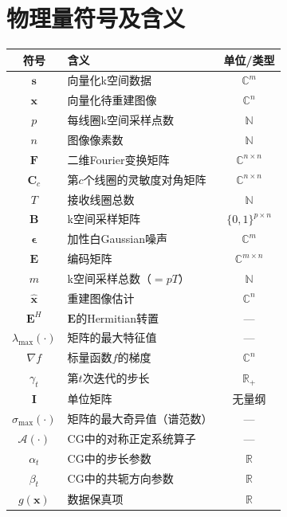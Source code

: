 \documentclass[12pt]{article}
\begin{document}
\section{物理量符号及含义}
\begin{table}[ht]
    \small
    \centering
    \begin{tabularx}{\textwidth}{c X c}
        \toprule
        \textbf{符号} & \textbf{含义} & \textbf{单位/类型} \\
        \midrule
        $\bm{s}$ & 向量化k空间数据 & $\mathbb{C}^m$ \\
        $\bm{x}$ & 向量化待重建图像 & $\mathbb{C}^n$ \\
        $p$ & 每线圈k空间采样点数 & $\mathbb{N}$ \\
        $n$ & 图像像素数 & $\mathbb{N}$ \\
        $\mathbf{F}$ & 二维Fourier变换矩阵 & $\mathbb{C}^{n\times n}$ \\
        $\mathbf{C}_c$ & 第$c$个线圈的灵敏度对角矩阵 & $\mathbb{C}^{n\times n}$ \\
        $T$ & 接收线圈总数 & $\mathbb{N}$ \\
        $\mathbf{B}$ & k空间采样矩阵 & $\{0,1\}^{p\times n}$ \\
        $\bm{\epsilon}$ & 加性白Gaussian噪声 & $\mathbb{C}^m$ \\
        $\mathbf{E}$ & 编码矩阵 & $\mathbb{C}^{m\times n}$ \\
        $m$ & k空间采样总数（$=pT$） & $\mathbb{N}$ \\
        $\hat{\bm{x}}$ & 重建图像估计 & $\mathbb{C}^n$ \\
        $\mathbf{E}^H$ & $\mathbf{E}$的Hermitian转置 & --- \\
        $\lambda_{\max}(\cdot)$ & 矩阵的最大特征值 & --- \\
        $\nabla f$ & 标量函数$f$的梯度 & $\mathbb{C}^n$ \\
        $\gamma_t$ & 第$t$次迭代的步长 & $\mathbb{R}_+$ \\
        $\mathbf{I}$ & 单位矩阵 & 无量纲 \\
        $\sigma_{\max}(\cdot)$ & 矩阵的最大奇异值（谱范数） & --- \\
        $\mathcal{A}(\cdot)$ & CG中的对称正定系统算子 & --- \\
        $\alpha_t$ & CG中的步长参数 & $\mathbb{R}$ \\
        $\beta_t$ & CG中的共轭方向参数 & $\mathbb{R}$ \\
        $g(\bm{x})$ & 数据保真项 & $\mathbb{R}$ \\

\end{tabularx}
\end{table}
\end{document}
